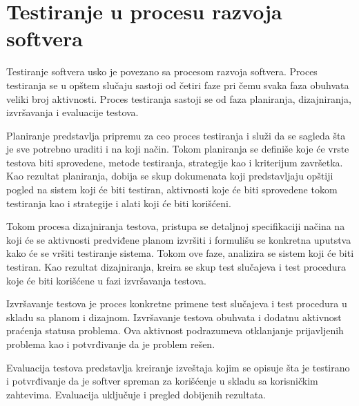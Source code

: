 \documentclass[12pt,oneside]{memoir}
\begin{document}
\section{Testiranje u procesu razvoja softvera} \label{broj1}
\par 
Testiranje softvera usko je povezano sa procesom razvoja softvera.
Proces testiranja se u opštem slučaju sastoji od četiri faze pri čemu svaka faza obuhvata veliki broj aktivnosti. Proces testiranja sastoji se od faza planiranja, dizajniranja, izvršavanja i evaluacije testova.
\par
Planiranje predstavlja pripremu za ceo proces testiranja i služi da se sagleda šta je sve potrebno uraditi i na koji način. Tokom planiranja se definiše koje će vrste testova biti sprovedene, metode testiranja, strategije kao i kriterijum završetka. Kao rezultat planiranja, dobija se skup dokumenata koji predstavljaju opštiji pogled na sistem koji će biti testiran, aktivnosti koje će biti sprovedene tokom testiranja kao i strategije i alati koji će biti korišćeni.
\par 
Tokom procesa dizajniranja testova, pristupa se detaljnoj specifikaciji načina na koji će se aktivnosti predviđene planom izvršiti i formulišu se konkretna uputstva kako će se vršiti testiranje sistema. Tokom ove faze, analizira se sistem koji će biti testiran. Kao rezultat dizajniranja, kreira se skup test slučajeva i test procedura koje će biti korišćene u fazi izvršavanja testova.

Izvršavanje testova je proces konkretne primene test slučajeva i test procedura u skladu sa planom i dizajnom. Izvršavanje testova obuhvata i dodatnu aktivnost praćenja statusa problema. Ova aktivnost podrazumeva otklanjanje prijavljenih problema kao i potvrđivanje da je problem rešen.

Evaluacija testova predstavlja kreiranje izveštaja kojim se opisuje šta je testirano i potvrđivanje da je softver spreman za korišćenje u skladu sa korisničkim zahtevima. Evaluacija uključuje i pregled dobijenih rezultata.  
\end{document}
